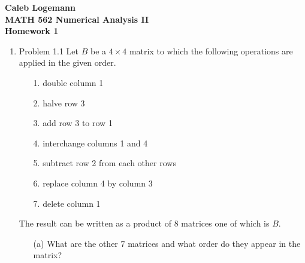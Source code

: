 \documentclass[11pt]{article}
\begin{document}
\noindent \textbf{\Large{Caleb Logemann \\
MATH 562 Numerical Analysis II \\
Homework 1
}}

\begin{enumerate}
    \item %
        Problem 1.1
        Let $B$ be a $4 \times 4$ matrix to which the following operations are
        applied in the given order.
        \begin{enumerate}
            \item[1.] double column 1
            \item[2.] halve row 3
            \item[3.] add row 3 to row 1
            \item[4.] interchange columns 1 and 4
            \item[5.] subtract row 2 from each other rows
            \item[6.] replace column 4 by column 3
            \item[7.] delete column 1
        \end{enumerate}
        The result can be written as a product of 8 matrices one of which is $B$.
        \begin{enumerate}
            \item[(a)]
                What are the other 7 matrices and what order do they appear in
                the matrix?


\end{enumerate}
\end{enumerate}
\end{document}
